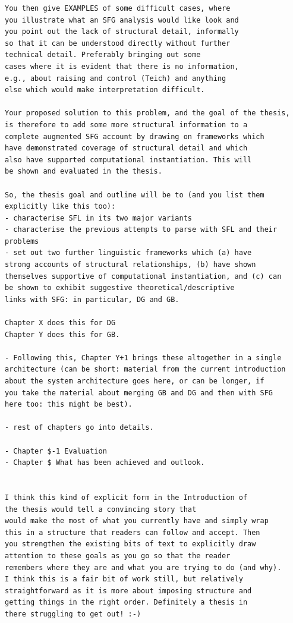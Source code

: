 \begin{Verbatim}
You then give EXAMPLES of some difficult cases, where
you illustrate what an SFG analysis would like look and
you point out the lack of structural detail, informally
so that it can be understood directly without further
technical detail. Preferably bringing out some
cases where it is evident that there is no information,
e.g., about raising and control (Teich) and anything
else which would make interpretation difficult.

Your proposed solution to this problem, and the goal of the thesis,
is therefore to add some more structural information to a
complete augmented SFG account by drawing on frameworks which
have demonstrated coverage of structural detail and which
also have supported computational instantiation. This will
be shown and evaluated in the thesis.

So, the thesis goal and outline will be to (and you list them
explicitly like this too):
- characterise SFL in its two major variants
- characterise the previous attempts to parse with SFL and their problems
- set out two further linguistic frameworks which (a) have
strong accounts of structural relationships, (b) have shown
themselves supportive of computational instantiation, and (c) can
be shown to exhibit suggestive theoretical/descriptive
links with SFG: in particular, DG and GB.

Chapter X does this for DG
Chapter Y does this for GB.

- Following this, Chapter Y+1 brings these altogether in a single
architecture (can be short: material from the current introduction
about the system architecture goes here, or can be longer, if
you take the material about merging GB and DG and then with SFG
here too: this might be best).

- rest of chapters go into details.

- Chapter $-1 Evaluation
- Chapter $ What has been achieved and outlook.


I think this kind of explicit form in the Introduction of
the thesis would tell a convincing story that
would make the most of what you currently have and simply wrap
this in a structure that readers can follow and accept. Then
you strengthen the existing bits of text to explicitly draw
attention to these goals as you go so that the reader
remembers where they are and what you are trying to do (and why).
I think this is a fair bit of work still, but relatively
straightforward as it is more about imposing structure and
getting things in the right order. Definitely a thesis in
there struggling to get out! :-)


\end{Verbatim}
